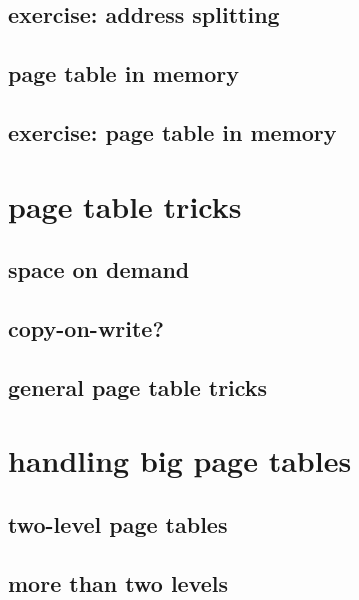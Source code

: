 

\subsection{exercise: address splitting}



\subsection{page table in memory}


\subsection{exercise: page table in memory}


\section{page table tricks}

\subsection{space on demand}


\subsection{copy-on-write?} %



\subsection{general page table tricks}




\section{handling big page tables}


\subsection{two-level page tables}



\subsection{more than two levels}


